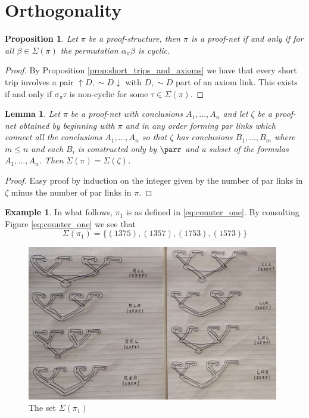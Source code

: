 \documentclass[12pt]{article}
\theoremstyle{plain}
\newtheorem{proposition}[thm]{Proposition}
\newtheorem{lemma}[thm]{Lemma}
\theoremstyle{definition}
\newtheorem{example}[thm]{Example}
\newcommand{\negation}{\sim}
\begin{document}
\section{Orthogonality}









\begin{proposition}
Let $\pi$ be a proof-structure, then $\pi$ is a proof-net if and only if for all $\beta \in \Sigma(\pi)$ the permutation $\alpha_{\pi}\beta$ is cyclic.
\end{proposition}
\begin{proof}
By Proposition \ref{prop:short_trips_and_axioms} we have that every short trip involves a pair $\uparrow D, \negation D\downarrow$ with $D,\negation D$ part of an axiom link. This exists if and only if $\sigma_{\pi}\tau$ is non-cyclic for some $\tau \in \Sigma(\pi)$.
\end{proof}
\begin{lemma}\label{lem:pars_or_not}
Let $\pi$ be a proof-net with conclusions $A_1,...,A_n$ and let $\zeta$ be a proof-net obtained by beginning with $\pi$ and in any order forming par links which connect all the conclusions $A_1,...,A_n$ so that $\zeta$ has conclusions $B_1,...,B_m$ where $m \leq n$ and each $B_i$ is constructed only by $\parr$ and a subset of the formulas $A_1,...,A_n$. Then $\Sigma(\pi) = \Sigma(\zeta)$.
\end{lemma}
\begin{proof}
Easy proof by induction on the integer given by the number of par links in $\zeta$ minus the number of par links in $\pi$.
\end{proof}
\begin{example}\label{ex:counter}
In what follows, $\pi_1$ is as defined in \eqref{eq:counter_one}. By consulting Figure \ref{eq:counter_one} we see that
\begin{equation}
\Sigma(\pi_1) = \lbrace (1375), (1357), (1753), (1573)\rbrace
\end{equation}
\begin{figure}[h]
    \centering
    \includegraphics[width = 11cm]{counter_one.jpg}
    \caption{The set $\Sigma(\pi_1)$}
    \label{fig:counter_one}
\end{figure}
\end{example}
\end{document}
